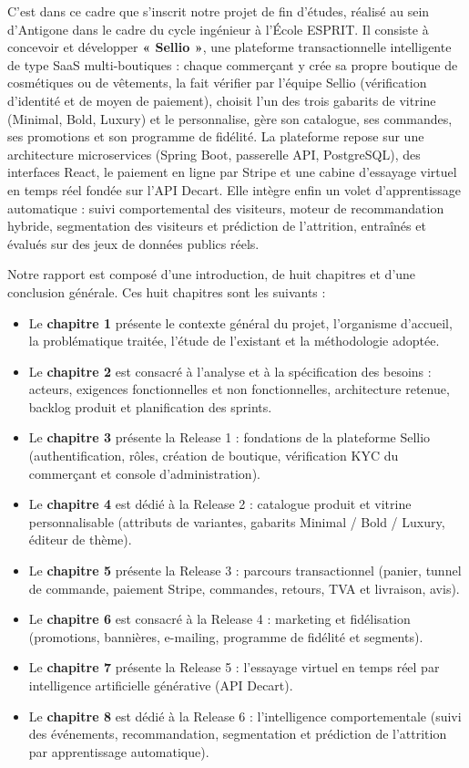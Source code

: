 \documentclass[a4paper,12pt]{report}
\begin{document}
\vspace{0.5cm}
C'est dans ce cadre que s'inscrit notre projet de fin d'études, réalisé au sein d'Antigone dans le cadre du cycle ingénieur à l'École ESPRIT. Il consiste à concevoir et développer \textsf{\textbf{« Sellio »}}, une plateforme transactionnelle intelligente de type SaaS multi-boutiques : chaque commerçant y crée sa propre boutique de cosmétiques ou de vêtements, la fait vérifier par l'équipe Sellio (vérification d'identité et de moyen de paiement), choisit l'un des trois gabarits de vitrine (Minimal, Bold, Luxury) et le personnalise, gère son catalogue, ses commandes, ses promotions et son programme de fidélité. La plateforme repose sur une architecture microservices (Spring Boot, passerelle API, PostgreSQL), des interfaces React, le paiement en ligne par Stripe et une cabine d'essayage virtuel en temps réel fondée sur l'API Decart. Elle intègre enfin un volet d'apprentissage automatique : suivi comportemental des visiteurs, moteur de recommandation hybride, segmentation des visiteurs et prédiction de l'attrition, entraînés et évalués sur des jeux de données publics réels.

\vspace{0.5cm}
Notre rapport est composé d'une introduction, de huit chapitres et d'une conclusion générale. Ces huit chapitres sont les suivants :
\begin{itemize}
\item Le \textbf{chapitre 1} présente le contexte général du projet, l'organisme d'accueil, la problématique traitée, l'étude de l'existant et la méthodologie adoptée.
\item Le \textbf{chapitre 2} est consacré à l'analyse et à la spécification des besoins : acteurs, exigences fonctionnelles et non fonctionnelles, architecture retenue, backlog produit et planification des sprints.
\item Le \textbf{chapitre 3} présente la Release 1 : fondations de la plateforme Sellio (authentification, rôles, création de boutique, vérification KYC du commerçant et console d'administration).
\item Le \textbf{chapitre 4} est dédié à la Release 2 : catalogue produit et vitrine personnalisable (attributs de variantes, gabarits Minimal / Bold / Luxury, éditeur de thème).
\item Le \textbf{chapitre 5} présente la Release 3 : parcours transactionnel (panier, tunnel de commande, paiement Stripe, commandes, retours, TVA et livraison, avis).
\item Le \textbf{chapitre 6} est consacré à la Release 4 : marketing et fidélisation (promotions, bannières, e-mailing, programme de fidélité et segments).
\item Le \textbf{chapitre 7} présente la Release 5 : l'essayage virtuel en temps réel par intelligence artificielle générative (API Decart).
\item Le \textbf{chapitre 8} est dédié à la Release 6 : l'intelligence comportementale (suivi des événements, recommandation, segmentation et prédiction de l'attrition par apprentissage automatique).
\end{itemize}
\end{document}
